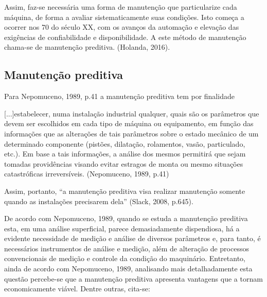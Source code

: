 \documentclass[
	12pt,				
	oneside,			
	a4paper,			
	english,			
	brazil				
	]{abntex2ppgsi}
\begin{document}
Assim, faz-se necessária uma forma de manutenção que particularize cada máquina, de forma a avaliar sistematicamente suas condições. Isto começa a ocorrer nos 70 do século XX, com os avanços da automação e elevação das exigências de confiabilidade e disponibilidade. A este método de manutenção chama-se de manutenção preditiva. (Holanda, 2016).  


\subsection{\textbf{Manutenção preditiva}}

Para Nepomuceno, 1989, p.41 a manutenção preditiva tem por finalidade 

\begin{citacao}

[...]estabelecer, numa instalação industrial qualquer, quais são os parâmetros que devem ser escolhidos em cada tipo de máquina ou equipamento, em função das informações que as alterações de tais parâmetros sobre o estado mecânico de um determinado componente (pistões, dilatação, rolamentos, vasão, particulado, etc.). Em base a tais informações, a análise dos mesmos permitirá que sejam tomadas providências visando evitar estragos de monta ou mesmo situações catastróficas irreversíveis. (Nepomuceno, 1989, p.41)

\end{citacao}

Assim, portanto, “a manutenção preditiva visa realizar manutenção somente quando as instalações precisarem dela” (Slack, 2008, p.645). 

De acordo com Nepomuceno, 1989, quando se estuda a manutenção preditiva esta, em uma análise superficial, parece demasiadamente dispendiosa, há a evidente necessidade de medição e análise de diversos parâmetros e, para tanto, é necessários instrumentos de análise e medição, além de alteração de processos convencionais de medição e controle da condição do maquinário. Entretanto, ainda de acordo com Nepomuceno, 1989, analisando mais detalhadamente esta questão percebe-se que a manutenção preditiva apresenta vantagens que a tornam economicamente viável. Dentre outras, cita-se: 
\end{document}
